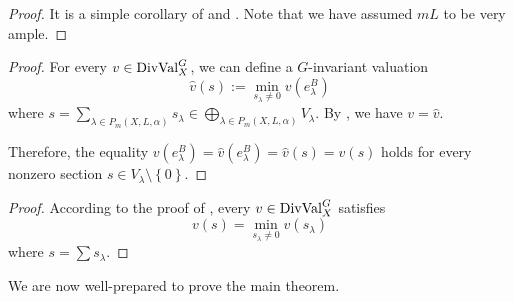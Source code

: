 \documentclass[11pt, oneside]{amsart}
\newtheorem{lemma}[theorem]{Lemma}
\def\{{\mathopen{}\left\lbrace} \def\}{\right\rbrace\mathclose{}}
\newcommand{\<}{\left\langle} \renewcommand{\>}{\right\rangle}
\let\oldbigoplus\bigoplus
\renewcommand{\bigoplus}{\oldbigoplus\limits}
\let\oldsum\sum
\renewcommand{\sum}{\oldsum\limits}
\renewcommand{\hat}{\widehat}
\begin{document}
\begin{proof}
	It is a simple corollary of  and . Note that we have assumed $m L$ to be very ample.
\end{proof}

\begin{proof}
	For every $v \in \mathrm{DivVal}^G_X$, we can define a $G$-invariant valuation
	\begin{equation*}
		\hat{v}(s) := \min\limits_{s_\lambda \neq 0} v(e^B_\lambda)
	\end{equation*}
	where $s = \sum_{\lambda \in P_m(X, L, \alpha)} s_\lambda \in \bigoplus_{\lambda \in P_m(X, L, \alpha)} V_\lambda$. By , we have $v = \hat{v}$.

	Therefore, the equality $v(e^B_\lambda) = \hat{v}(e^B_\lambda) = \hat{v}(s) = v(s)$ holds for every nonzero section $s \in V_\lambda \setminus \{0\}$.
\end{proof}

\begin{proof}
	According to the proof of , every $v \in \mathrm{DivVal}^G_X$ satisfies
	\begin{equation*}
		v(s) = \min_{s_\lambda \neq 0} v(s_\lambda)
	\end{equation*}
	where $s = \sum s_\lambda$.
\end{proof}

We are now well-prepared to prove the main theorem.
\end{document}
